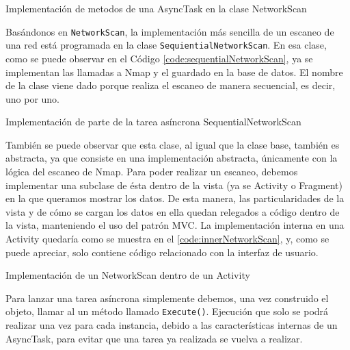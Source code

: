 \begin{code}
	\caption{Implementación de metodos de una AsyncTask en la clase NetworkScan}
	\label{code:networkScan}
	
\end{code}

Basándonos en \texttt{NetworkScan}, la implementación más sencilla de un escaneo de una red está programada en la clase \texttt{SequientialNetworkScan}. En esa clase, como se puede observar en el Código \ref{code:sequentialNetworkScan}, ya se implementan las llamadas a Nmap y el guardado en la base de datos. El nombre de la clase viene dado porque realiza el escaneo de manera secuencial, es decir, uno por uno.

\begin{code}
	\caption{Implementación de parte de la tarea asíncrona SequentialNetworkScan}
	\label{code:sequentialNetworkScan}
	
\end{code}

También se puede observar que esta clase, al igual que la clase base, también es abstracta, ya que consiste en una implementación abstracta, únicamente con la lógica del escaneo de Nmap. Para poder realizar un escaneo, debemos implementar una subclase de ésta dentro de la vista (ya se Activity o Fragment) en la que queramos mostrar los datos. De esta manera, las particularidades de la vista y de cómo se cargan los datos en ella quedan relegados a código dentro de la vista, manteniendo el uso del patrón MVC. La implementación interna en una Activity quedaría como se muestra en el \ref{code:innerNetworkScan}, y, como se puede apreciar, solo contiene código relacionado con la interfaz de usuario.

\begin{code}
	\caption{Implementación de un NetworkScan dentro de un Activity}
	\label{code:innerNetworkScan}
	
\end{code}

Para lanzar una tarea asíncrona simplemente debemos, una vez construido el objeto, llamar al un método llamado \texttt{Execute()}. Ejecución que solo se podrá realizar una vez para cada instancia, debido a las características internas de un AsyncTask, para evitar que una tarea ya realizada se vuelva a realizar.

